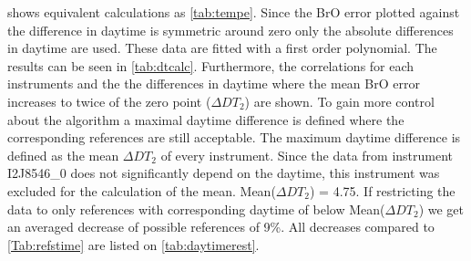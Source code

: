 \documentclass  [
  paper    = a4,
  BCOR     = 10mm,
  twoside,
  fontsize = 12pt,
  fleqn,
  toc      = bibnumbered,
  toc      = listofnumbered,
  numbers  = noendperiod,
  headings = normal,
  listof   = leveldown,
  version  = 3.03
]                                       {scrreprt}
\begin{document}
 shows equivalent calculations as \cref{tab:tempe}. Since the BrO error plotted against the difference in daytime is symmetric around zero only the absolute differences in daytime are used. These data are fitted with a first order polynomial. The results can be seen in \cref{tab:dtcalc}. Furthermore, the correlations for each instruments and the the differences in daytime where the mean BrO error increases to twice of the zero point ($\Delta DT_{2}$) are shown. To gain more control about the algorithm a maximal daytime difference is defined where the corresponding references are still acceptable. The maximum daytime difference is defined as the mean $\Delta DT_{2}$ of every instrument. Since the data from instrument I2J8546\_0 does not significantly depend on the daytime, this instrument was excluded for the calculation of the mean. Mean($\Delta DT_{2}$) = 4.75. If restricting the data to only references with corresponding daytime of below Mean($\Delta DT_{2}$) we get an averaged decrease of possible references of 9\%. All decreases compared to \cref{Tab:refstime} are listed on \cref{tab:daytimerest}.
\end{document}
